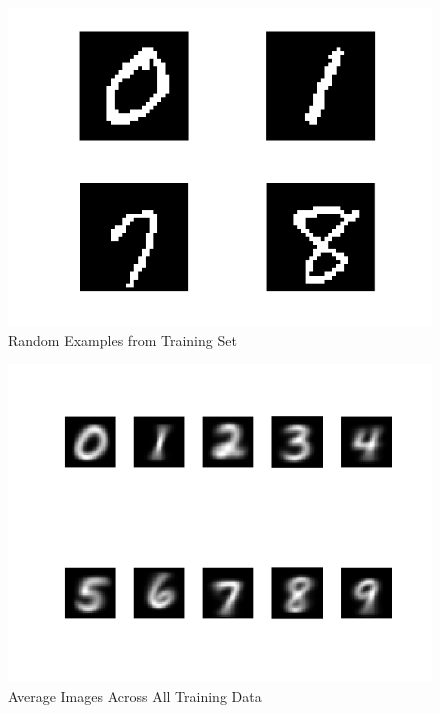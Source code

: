 \documentclass[12pt]{article}
\begin{document}
\begin{figure}[h]
	\caption{Random Examples from Training Set}
	\centering
	\includegraphics[scale=0.25]{partii_img1.png}
\end{figure}
\begin{figure}
	\caption{Average Images Across All Training Data}
	\centering
	\includegraphics[scale=0.5]{partii_img2.png}
\end{figure}
\end{document}
